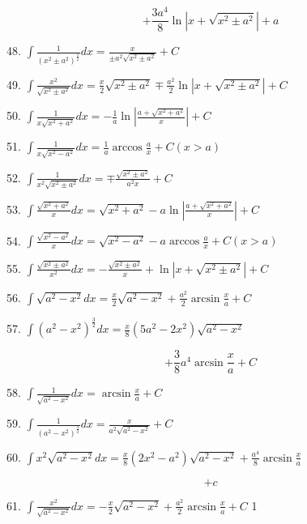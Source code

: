\documentclass[10pt]{article}
\begin{document}
\[
+ \frac{3{a}^{4}}{8}\ln \left| {x + \sqrt{{x}^{2} \pm {a}^{2}}}\right| + a
\]

48. \(\int \frac{1}{{\left( {x}^{2} \pm {a}^{2}\right) }^{\frac{3}{2}}}{dx} = \frac{x}{\pm {a}^{2}\sqrt{{x}^{2} \pm {a}^{2}}} + C\)

49. \(\int \frac{{x}^{2}}{\sqrt{{x}^{2} \pm {a}^{2}}}{dx} = \frac{x}{2}\sqrt{{x}^{2} \pm {a}^{2}} \mp \frac{{a}^{2}}{2}\ln \left| {x + \sqrt{{x}^{2} \pm {a}^{2}}}\right| + C\)

50. \(\int \frac{1}{x\sqrt{{x}^{2} + {a}^{2}}}{dx} = - \frac{1}{a}\ln \left| \frac{a + \sqrt{{x}^{2} + {a}^{2}}}{x}\right| + C\)

51. \(\int \frac{1}{x\sqrt{{x}^{2} - {a}^{2}}}{dx} = \frac{1}{a}\arccos \frac{a}{x} + C\left( {x > a}\right)\)

52. \(\int \frac{1}{{x}^{2}\sqrt{{x}^{2} \pm {a}^{2}}}{dx} = \mp \frac{\sqrt{{x}^{2} \pm {a}^{2}}}{{a}^{2}x} + C\)

53. \(\int \frac{\sqrt{{x}^{2} + {a}^{2}}}{x}{dx} = \sqrt{{x}^{2} + {a}^{2}} - a\ln \left| \frac{a + \sqrt{{x}^{2} + {a}^{2}}}{x}\right| + C\)

54. \(\int \frac{\sqrt{{x}^{2} - {a}^{2}}}{x}{dx} = \sqrt{{x}^{2} - {a}^{2}} - a\arccos \frac{a}{x} + C\left( {x > a}\right)\)

55. \(\int \frac{\sqrt{{x}^{2} \pm {a}^{2}}}{{x}^{2}}{dx} = - \frac{\sqrt{{x}^{2} \pm {a}^{2}}}{x} + \ln \left| {x + \sqrt{{x}^{2} \pm {a}^{2}}}\right| + C\)

56. \(\int \sqrt{{a}^{2} - {x}^{2}}{dx} = \frac{x}{2}\sqrt{{a}^{2} - {x}^{2}} + \frac{{a}^{2}}{2}\arcsin \frac{x}{a} + C\)

57. \(\int {\left( {a}^{2} - {x}^{2}\right) }^{\frac{3}{2}}{dx} = \frac{x}{8}\left( {5{a}^{2} - 2{x}^{2}}\right) \sqrt{{a}^{2} - {x}^{2}}\)

\[
+ \frac{3}{8}{a}^{4}\arcsin \frac{x}{a} + C
\]

58. \(\int \frac{1}{\sqrt{{a}^{2} - {x}^{2}}}{dx} = \arcsin \frac{x}{a} + C\)

59. \(\int \frac{1}{{\left( {a}^{2} - {x}^{2}\right) }^{\frac{3}{2}}}{dx} = \frac{x}{{a}^{2}\sqrt{{a}^{2} - {x}^{2}}} + C\)

60. \(\int {x}^{2}\sqrt{{a}^{2} - {x}^{2}}{dx} = \frac{x}{8}\left( {2{x}^{2} - {a}^{2}}\right) \sqrt{{a}^{2} - {x}^{2}} + \frac{{a}^{4}}{8}\arcsin \frac{x}{a}\)

\[
+ c
\]

61. \(\int \frac{{x}^{2}}{\sqrt{{a}^{2} - {x}^{2}}}{dx} = - \frac{x}{2}\sqrt{{a}^{2} - {x}^{2}} + \frac{{a}^{2}}{2}\arcsin \frac{x}{a} + C\) 1
\end{document}
